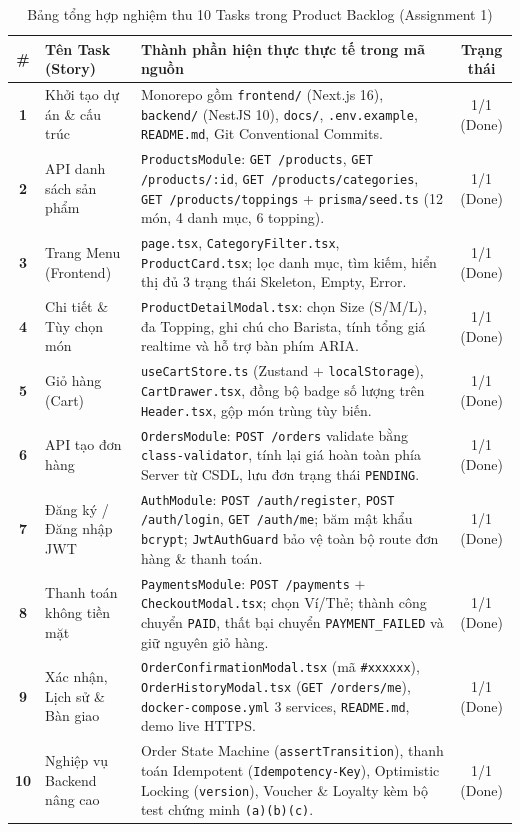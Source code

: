 \documentclass[a4paper,12pt]{article}
\begin{document}
\begin{table}[h!]
\centering
\scriptsize
\begin{tabularx}{\textwidth}{|c|l|X|c|}
\hline
\textbf{\#} & \textbf{Tên Task (Story)} & \textbf{Thành phần hiện thực thực tế trong mã nguồn} & \textbf{Trạng thái} \\
\hline
\textbf{1} & Khởi tạo dự án \& cấu trúc & Monorepo gồm \texttt{frontend/} (Next.js 16), \texttt{backend/} (NestJS 10), \texttt{docs/}, \texttt{.env.example}, \texttt{README.md}, Git Conventional Commits. & 1/1 (Done) \\
\hline
\textbf{2} & API danh sách sản phẩm & \texttt{ProductsModule}: \texttt{GET /products}, \texttt{GET /products/:id}, \texttt{GET /products/categories}, \texttt{GET /products/toppings} + \texttt{prisma/seed.ts} (12 món, 4 danh mục, 6 topping). & 1/1 (Done) \\
\hline
\textbf{3} & Trang Menu (Frontend) & \texttt{page.tsx}, \texttt{CategoryFilter.tsx}, \texttt{ProductCard.tsx}; lọc danh mục, tìm kiếm, hiển thị đủ 3 trạng thái Skeleton, Empty, Error. & 1/1 (Done) \\
\hline
\textbf{4} & Chi tiết \& Tùy chọn món & \texttt{ProductDetailModal.tsx}: chọn Size (S/M/L), đa Topping, ghi chú cho Barista, tính tổng giá realtime và hỗ trợ bàn phím ARIA. & 1/1 (Done) \\
\hline
\textbf{5} & Giỏ hàng (Cart) & \texttt{useCartStore.ts} (Zustand + \texttt{localStorage}), \texttt{CartDrawer.tsx}, đồng bộ badge số lượng trên \texttt{Header.tsx}, gộp món trùng tùy biến. & 1/1 (Done) \\
\hline
\textbf{6} & API tạo đơn hàng & \texttt{OrdersModule}: \texttt{POST /orders} validate bằng \texttt{class-validator}, tính lại giá hoàn toàn phía Server từ CSDL, lưu đơn trạng thái \texttt{PENDING}. & 1/1 (Done) \\
\hline
\textbf{7} & Đăng ký / Đăng nhập JWT & \texttt{AuthModule}: \texttt{POST /auth/register}, \texttt{POST /auth/login}, \texttt{GET /auth/me}; băm mật khẩu \texttt{bcrypt}; \texttt{JwtAuthGuard} bảo vệ toàn bộ route đơn hàng \& thanh toán. & 1/1 (Done) \\
\hline
\textbf{8} & Thanh toán không tiền mặt & \texttt{PaymentsModule}: \texttt{POST /payments} + \texttt{CheckoutModal.tsx}; chọn Ví/Thẻ; thành công chuyển \texttt{PAID}, thất bại chuyển \texttt{PAYMENT\_FAILED} và giữ nguyên giỏ hàng. & 1/1 (Done) \\
\hline
\textbf{9} & Xác nhận, Lịch sử \& Bàn giao & \texttt{OrderConfirmationModal.tsx} (mã \texttt{\#xxxxxx}), \texttt{OrderHistoryModal.tsx} (\texttt{GET /orders/me}), \texttt{docker-compose.yml} 3 services, \texttt{README.md}, demo live HTTPS. & 1/1 (Done) \\
\hline
\textbf{10} & Nghiệp vụ Backend nâng cao & Order State Machine (\texttt{assertTransition}), thanh toán Idempotent (\texttt{Idempotency-Key}), Optimistic Locking (\texttt{version}), Voucher \& Loyalty kèm bộ test chứng minh \texttt{(a)(b)(c)}. & 1/1 (Done) \\
\hline
\end{tabularx}
\caption{Bảng tổng hợp nghiệm thu 10 Tasks trong Product Backlog (Assignment 1)}
\end{table}
\end{document}
